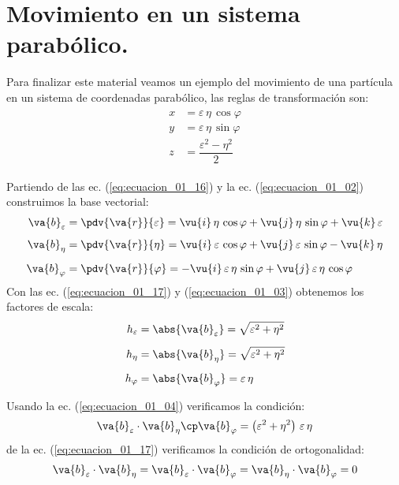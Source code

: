 \section{Movimiento en un sistema parabólico.}

Para finalizar este material veamos un ejemplo del movimiento de una partícula en un sistema de coordenadas parabólico, las reglas de transformación son:
\begin{align}
\begin{aligned}
x &= \varepsilon \, \eta \, \cos \varphi \\[0.3em]
y &= \varepsilon \, \eta \, \sin \varphi \\[0.3em]
z &= \dfrac{\varepsilon^{2} - \eta^{2}}{2}
\end{aligned}
\label{eq:ecuacion_01_16}
\end{align}

Partiendo de las ec. (\ref{eq:ecuacion_01_16}) y la ec. (\ref{eq:ecuacion_01_02}) construimos la base vectorial:
\begin{align}
\begin{aligned}
\va{b}_{\varepsilon} &= \pdv{\va{r}}{\varepsilon} = \vu{i} \, \eta \, \cos \varphi + \vu{j} \, \eta \, \sin \varphi + \vu{k} \, \varepsilon \\[0.5em]
\va{b}_{\eta} &= \pdv{\va{r}}{\eta} = \vu{i} \, \varepsilon \, \cos \varphi + \vu{j} \, \varepsilon \, \sin \varphi - \vu{k} \, \eta \\[0.5em]
\va{b}_{\varphi} &= \pdv{\va{r}}{\varphi} = - \vu{i} \, \varepsilon \, \eta \, \sin \varphi + \vu{j} \, \varepsilon \, \eta \, \cos \varphi
\end{aligned}
\label{eq:ecuacion_01_17}
\end{align}
Con las ec. (\ref{eq:ecuacion_01_17}) y (\ref{eq:ecuacion_01_03}) obtenemos los factores de escala:
\begin{align}
\begin{aligned}
h_{\varepsilon} &= \abs{\va{b}_{\varepsilon}} = \sqrt{\varepsilon^{2} + \eta^{2}} \\[0.5em]
h_{\eta} &= \abs{\va{b}_{\eta}} = \sqrt{\varepsilon^{2} + \eta^{2}} \\[0.5em]
h_{\varphi} &= \abs{\va{b}_{\varphi}} = \varepsilon \, \eta
\end{aligned}
\label{eq:ecuacion_01_18}
\end{align}

Usando la ec. (\ref{eq:ecuacion_01_04}) verificamos la condición:
\begin{align}
\va{b}_{\varepsilon} \cdot \va{b}_{\eta} \cp \va{b}_{\varphi} = \left( \varepsilon^{2} + \eta^{2} \right) \, \varepsilon \, \eta
\label{eq:ecuacion_01_19}
\end{align}
de la ec. (\ref{eq:ecuacion_01_17}) verificamos la condición de ortogonalidad:
\begin{align}
\va{b}_{\varepsilon} \cdot \va{b}_{\eta} = \va{b}_{\varepsilon} \cdot \va{b}_{\varphi} = \va{b}_{\eta} \cdot \va{b}_{\varphi} = 0
\label{eq:ecuacion_01_20}
\end{align}

